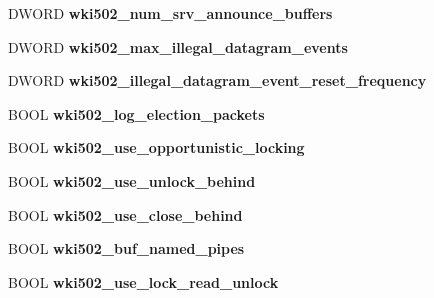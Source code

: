 \begin{DoxyCompactItemize}
\item 
\mbox{\label{struct___w_k_s_t_a___i_n_f_o__502_a6ef9618550744d4a6a1dcbdde653c406}} 
D\+W\+O\+RD {\bfseries wki502\+\_\+num\+\_\+srv\+\_\+announce\+\_\+buffers}
\item 
\mbox{\label{struct___w_k_s_t_a___i_n_f_o__502_ac3470e60490f48990cedcbe0bee50038}} 
D\+W\+O\+RD {\bfseries wki502\+\_\+max\+\_\+illegal\+\_\+datagram\+\_\+events}
\item 
\mbox{\label{struct___w_k_s_t_a___i_n_f_o__502_a1244ca7ad1db72f320bd9e5cbb7fc583}} 
D\+W\+O\+RD {\bfseries wki502\+\_\+illegal\+\_\+datagram\+\_\+event\+\_\+reset\+\_\+frequency}
\item 
\mbox{\label{struct___w_k_s_t_a___i_n_f_o__502_ab1445ec303076c69d7ec9ad48bf21e77}} 
B\+O\+OL {\bfseries wki502\+\_\+log\+\_\+election\+\_\+packets}
\item 
\mbox{\label{struct___w_k_s_t_a___i_n_f_o__502_a18354079e6d7cba9bb3d115bbd2d25f7}} 
B\+O\+OL {\bfseries wki502\+\_\+use\+\_\+opportunistic\+\_\+locking}
\item 
\mbox{\label{struct___w_k_s_t_a___i_n_f_o__502_a8679803807a424eec2b344be99f21cd6}} 
B\+O\+OL {\bfseries wki502\+\_\+use\+\_\+unlock\+\_\+behind}
\item 
\mbox{\label{struct___w_k_s_t_a___i_n_f_o__502_a59d7166f77bd0d65608cd894abc8fb84}} 
B\+O\+OL {\bfseries wki502\+\_\+use\+\_\+close\+\_\+behind}
\item 
\mbox{\label{struct___w_k_s_t_a___i_n_f_o__502_a4defbe90851f2a46ca96245ebd4218e6}} 
B\+O\+OL {\bfseries wki502\+\_\+buf\+\_\+named\+\_\+pipes}
\item 
\mbox{\label{struct___w_k_s_t_a___i_n_f_o__502_afbf353e528ff635e9350c41132628cdc}} 
B\+O\+OL {\bfseries wki502\+\_\+use\+\_\+lock\+\_\+read\+\_\+unlock}
\item 
\mbox{\label{struct___w_k_s_t_a___i_n_f_o__502_a56d325d14f1e0cbde9c6a9565f09c847}} 

\end{DoxyCompactItemize}
